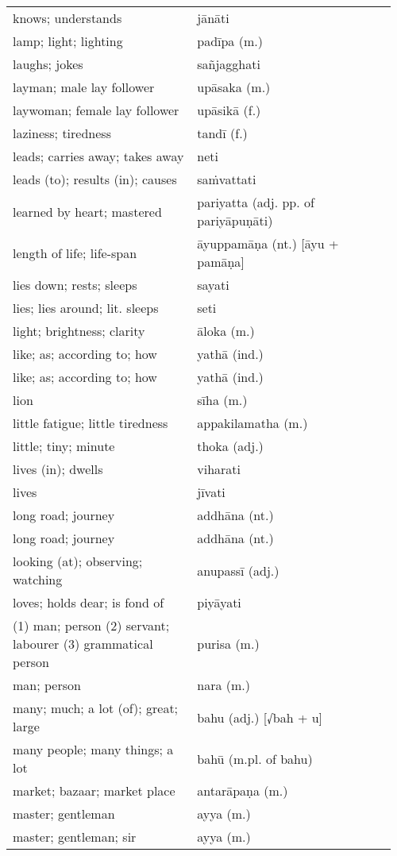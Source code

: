 \documentclass[a5paper]{memoir}
\begin{document}
\begin{longtable}{L{0.48\linewidth} L{0.48\linewidth} H}
knows; understands & jānāti & \\
lamp; light; lighting & padīpa (m.) & \\
laughs; jokes & sañjagghati & \\
layman; male lay follower & upāsaka (m.) & \\
laywoman; female lay follower & upāsikā (f.) & \\
laziness; tiredness & tandī (f.) & \\
leads; carries away; takes away & neti & \\
leads (to); results (in); causes & saṁvattati & \\
learned by heart; mastered & pariyatta (adj. pp. of pariyāpuṇāti) & \\
length of life; life-span & āyuppamāṇa (nt.) [āyu + pamāṇa] & \\
lies down; rests; sleeps & sayati & \\
lies; lies around; lit. sleeps & seti & \\
light; brightness; clarity & āloka (m.) & \\
like; as; according to; how & yathā (ind.) & \\
like; as; according to; how & yathā (ind.) & \\
lion & sīha (m.) & \\
little fatigue; little tiredness & appakilamatha (m.) & \\
little; tiny; minute & thoka (adj.) & \\
lives (in); dwells & viharati & \\
lives & jīvati & \\
long road; journey & addhāna (nt.) & \\
long road; journey & addhāna (nt.) & \\
looking (at); observing; watching & anupassī (adj.) & \\
loves; holds dear; is fond of & piyāyati & \\
(1) man; person (2) servant; labourer (3) grammatical person & purisa (m.) & \\
man; person & nara (m.) & \\
many; much; a lot (of); great; large & bahu (adj.) [√bah + u] & \\
many people; many things; a lot & bahū (m.pl. of bahu) & \\
market; bazaar; market place & antarāpaṇa (m.) & \\
master; gentleman & ayya (m.) & \\
master; gentleman; sir & ayya (m.) & \\

\end{longtable}
\end{document}
